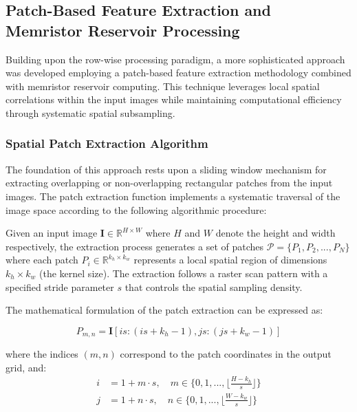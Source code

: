\documentclass[11pt, oneside]{article}
\begin{document}

\subsection{Patch-Based Feature Extraction and Memristor Reservoir Processing}

Building upon the row-wise processing paradigm, a more sophisticated approach was developed employing a patch-based feature extraction methodology combined with memristor reservoir computing. This technique leverages local spatial correlations within the input images while maintaining computational efficiency through systematic spatial subsampling.

\subsubsection{Spatial Patch Extraction Algorithm}

The foundation of this approach rests upon a sliding window mechanism for extracting overlapping or non-overlapping rectangular patches from the input images. The patch extraction function implements a systematic traversal of the image space according to the following algorithmic procedure:



Given an input image \(\mathbf{I} \in \mathbb{R}^{H \times W}\) where \(H\) and \(W\) denote the height and width respectively, the extraction process generates a set of patches \(\mathcal{P} = \{P_1, P_2, ..., P_N\}\) where each patch \(P_i \in \mathbb{R}^{k_h \times k_w}\) represents a local spatial region of dimensions \(k_h \times k_w\) (the kernel size). The extraction follows a raster scan pattern with a specified stride parameter \(s\) that controls the spatial sampling density.

The mathematical formulation of the patch extraction can be expressed as:

\begin{equation}
    P_{m,n} = \mathbf{I}[is:(is+k_h-1), js:(js+k_w-1)]
\end{equation}

where the indices \((m,n)\) correspond to the patch coordinates in the output grid, and:
\begin{align}
    i & = 1 + m \cdot s, \quad m \in \{0, 1, ..., \lfloor\frac{H-k_h}{s}\rfloor\} \\
    j & = 1 + n \cdot s, \quad n \in \{0, 1, ..., \lfloor\frac{W-k_w}{s}\rfloor\}
\end{align}
\end{document}
